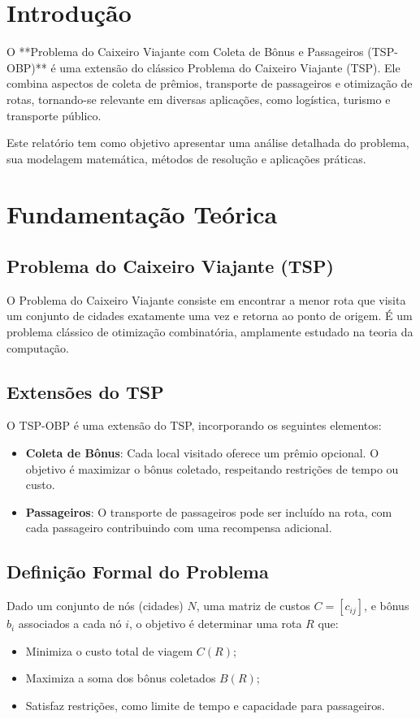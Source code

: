 \documentclass[12pt, a4paper]{report}
\begin{document}

\newpage
\tableofcontents
\thispagestyle{empty}


\chapter{Introdução}

O **Problema do Caixeiro Viajante com Coleta de Bônus e Passageiros (TSP-OBP)** é uma extensão do clássico Problema do Caixeiro Viajante (TSP). Ele combina aspectos de coleta de prêmios, transporte de passageiros e otimização de rotas, tornando-se relevante em diversas aplicações, como logística, turismo e transporte público.

Este relatório tem como objetivo apresentar uma análise detalhada do problema, sua modelagem matemática, métodos de resolução e aplicações práticas.

\chapter{Fundamentação Teórica}

\section{Problema do Caixeiro Viajante (TSP)}
O Problema do Caixeiro Viajante consiste em encontrar a menor rota que visita um conjunto de cidades exatamente uma vez e retorna ao ponto de origem. É um problema clássico de otimização combinatória, amplamente estudado na teoria da computação.

\section{Extensões do TSP}
O TSP-OBP é uma extensão do TSP, incorporando os seguintes elementos:
\begin{itemize}
    \item \textbf{Coleta de Bônus}: Cada local visitado oferece um prêmio opcional. O objetivo é maximizar o bônus coletado, respeitando restrições de tempo ou custo.
    \item \textbf{Passageiros}: O transporte de passageiros pode ser incluído na rota, com cada passageiro contribuindo com uma recompensa adicional.
\end{itemize}

\section{Definição Formal do Problema}
Dado um conjunto de nós (cidades) $N$, uma matriz de custos $C = [c_{ij}]$, e bônus $b_i$ associados a cada nó $i$, o objetivo é determinar uma rota $R$ que:
\begin{itemize}
    \item Minimiza o custo total de viagem $C(R)$;
    \item Maximiza a soma dos bônus coletados $B(R)$;
    \item Satisfaz restrições, como limite de tempo e capacidade para passageiros.
\end{itemize}
\end{document}
